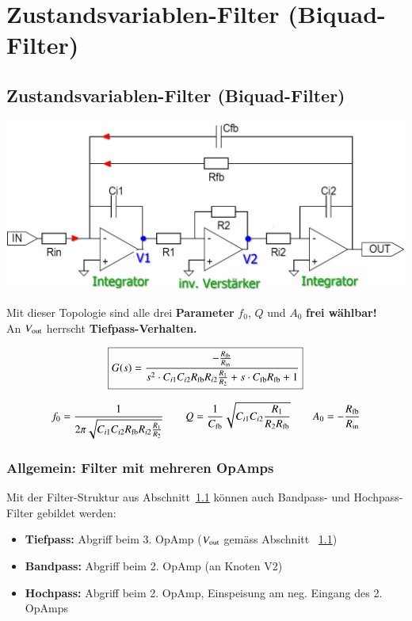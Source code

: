 
\section{Zustandsvariablen-Filter (Biquad-Filter)}

\subsection{Zustandsvariablen-Filter (Biquad-Filter)}
\label{zustandsvariablenfilter}

\begin{minipage}[c]{0.6\columnwidth}
    \includegraphics[width=\columnwidth]{images/zustandsvariablenfilter.png}
\end{minipage}
\hfill
\begin{minipage}[c]{0.38\columnwidth}
    \raggedright%
    Mit dieser Topologie sind alle drei \textbf{Parameter} $f_0$, $Q$ und $A_0$ \textbf{frei wählbar!} \\
    An $V_{\rm out}$ herrscht \textbf{Tiefpass-Verhalten.}
\end{minipage}

$$ \boxed{ G(s) = \frac{- \frac{R_{\rm fb}}{R_{\rm in}}}{s^2 \cdot C_{i1} C_{i2} R_{\rm fb} R_{i2} \frac{R_1}{R_2} + s \cdot C_{\rm fb} R_{\rm fb} + 1} } $$

$$ f_0 = \frac{1}{2 \pi \sqrt{C_{i1} C_{i2} R_{\rm fb} R_{i2} \frac{R_1}{R_2}}} \qquad Q = \frac{1}{C_{\rm fb}} \sqrt{C_{i1} C_{i2} \frac{R_1}{R_2 R_{\rm fb}} } 
\qquad A_0 = - \frac{R_{\rm fb}}{R_{\rm in}} $$


\subsubsection{Allgemein: Filter mit mehreren OpAmps}

Mit der Filter-Struktur aus Abschnitt~\ref{zustandsvariablenfilter} können auch Bandpass- und Hochpass-Filter gebildet werden:
\begin{itemize}
    \item \textbf{Tiefpass:} Abgriff beim 3. OpAmp ($V_{\rm out}$ gemäss Abschnitt ~\ref{zustandsvariablenfilter})
    \item \textbf{Bandpass:} Abgriff beim 2. OpAmp (an Knoten V2)
    \item \textbf{Hochpass:} Abgriff beim 2. OpAmp, Einspeisung am neg. Eingang des 2. OpAmps 
\end{itemize}


